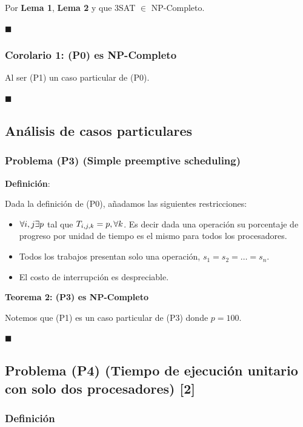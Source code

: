 \documentclass[14pt]{extarticle}
\begin{document}
Por \textbf{Lema 1}, \textbf{Lema 2} y que 3SAT $\in$ NP-Completo.

$\blacksquare$

\subsubsection*{Corolario 1: (P0) es NP-Completo}

Al ser (P1) un caso particular de (P0).

$\blacksquare$

\subsection*{Análisis de casos particulares}

\subsubsection*{Problema (P3) (Simple preemptive scheduling)}

\textbf{Definición}:

Dada la definición de (P0), añadamos las siguientes restricciones:

\begin{itemize}
    \item $\forall i, j \space \exists p$ tal que $T_{i, j, k} = p, \space \forall k$. Es decir dada una operación su porcentaje de progreso por unidad de tiempo es el mismo para todos los procesadores.
    \item Todos los trabajos presentan solo una operación, $s_1 = s_2 = \ldots = s_n$.
    \item El costo de interrupción es despreciable.
\end{itemize}

\textbf{Teorema 2: (P3) es NP-Completo}

Notemos que (P1) es un caso particular de (P3) donde $p = 100$.

$\blacksquare$

\subsection*{Problema (P4) (Tiempo de ejecución unitario con solo dos procesadores) [2]}

\subsubsection*{Definición}
\end{document}
